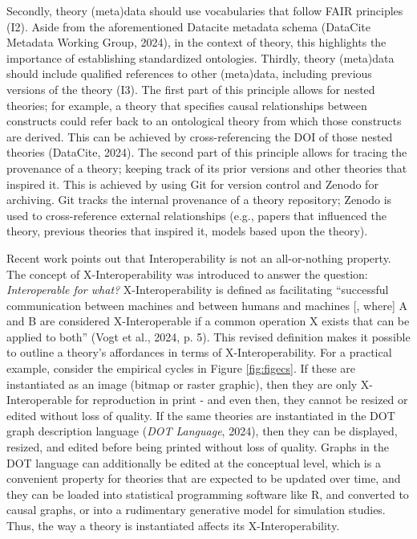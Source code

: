 \documentclass[
  man, noextraspace,floatsintext]{apa7}
\begin{document}
Secondly, theory (meta)data should use vocabularies that follow FAIR principles (I2).
Aside from the aforementioned Datacite metadata schema (DataCite Metadata Working Group, 2024),
in the context of theory, this highlights the importance of establishing standardized ontologies.
Thirdly, theory (meta)data should include qualified references to other (meta)data, including previous versions of the theory (I3).
The first part of this principle allows for nested theories;
for example, a theory that specifies causal relationships between constructs could refer back to an ontological theory from which those constructs are derived.
This can be achieved by cross-referencing the DOI of those nested theories (DataCite, 2024).
The second part of this principle allows for tracing the provenance of a theory; keeping track of its prior versions and other theories that inspired it.
This is achieved by using Git for version control and Zenodo for archiving.
Git tracks the internal provenance of a theory repository; Zenodo is used to cross-reference external relationships (e.g., papers that influenced the theory, previous theories that inspired it, models based upon the theory).

Recent work points out that Interoperability is not an all-or-nothing property.
The concept of X-Interoperability was introduced to answer the question: \emph{Interoperable for what?}
X-Interoperability is defined as facilitating ``successful communication between machines and between humans and machines {[}, where{]} A and B are considered X-Interoperable if a common operation X exists that can be applied to both'' (Vogt et al., 2024, p. 5).
This revised definition makes it possible to outline a theory's affordances in terms of X-Interoperability.
For a practical example, consider the empirical cycles in Figure \ref{fig:figecs}.
If these are instantiated as an image (bitmap or raster graphic),
then they are only X-Interoperable for reproduction in print - and even then, they cannot be resized or edited without loss of quality.
If the same theories are instantiated in the DOT graph description language (\emph{{DOT Language}}, 2024), then they can be displayed, resized, and edited before being printed without loss of quality.
Graphs in the DOT language can additionally be edited at the conceptual level, which is a convenient property for theories that are expected to be updated over time, and they can be loaded into statistical programming software like R, and converted to causal graphs, or into a rudimentary generative model for simulation studies.
Thus, the way a theory is instantiated affects its X-Interoperability.
\end{document}
